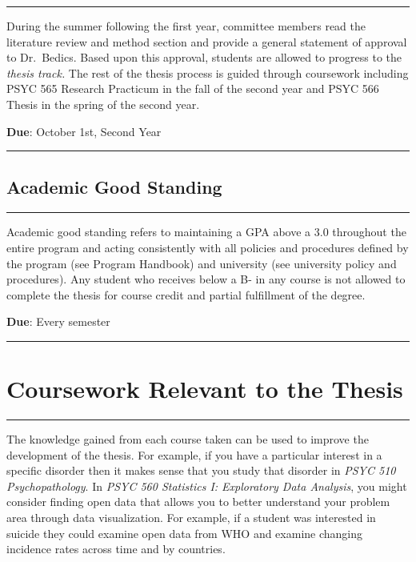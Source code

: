 \documentclass[openany]{book}
\begin{document}
\begin{center}\rule{0.5\linewidth}{0.5pt}\end{center}

During the summer following the first year, committee members read the literature review and method section and provide a general statement of approval to Dr.~Bedics. Based upon this approval, students are allowed to progress to the \emph{thesis track.} The rest of the thesis process is guided through coursework including PSYC 565 Research Practicum in the fall of the second year and PSYC 566 Thesis in the spring of the second year.

\textbf{Due}: October 1st, Second Year

\begin{center}\rule{0.5\linewidth}{0.5pt}\end{center}

\hypertarget{academic-good-standing}{%
\section{Academic Good Standing}\label{academic-good-standing}}

\begin{center}\rule{0.5\linewidth}{0.5pt}\end{center}

Academic good standing refers to maintaining a GPA above a 3.0 throughout the entire program and acting consistently with all policies and procedures defined by the program (see Program Handbook) and university (see university policy and procedures). Any student who receives below a B- in any course is not allowed to complete the thesis for course credit and partial fulfillment of the degree.

\textbf{Due}: Every semester

\begin{center}\rule{0.5\linewidth}{0.5pt}\end{center}

\hypertarget{coursework-relevant-to-the-thesis}{%
\chapter{Coursework Relevant to the Thesis}\label{coursework-relevant-to-the-thesis}}

\begin{center}\rule{0.5\linewidth}{0.5pt}\end{center}

The knowledge gained from each course taken can be used to improve the development of the thesis. For example, if you have a particular interest in a specific disorder then it makes sense that you study that disorder in \emph{PSYC 510 Psychopathology}. In \emph{PSYC 560 Statistics I: Exploratory Data Analysis}, you might consider finding open data that allows you to better understand your problem area through data visualization. For example, if a student was interested in suicide they could examine open data from WHO and examine changing incidence rates across time and by countries.
\end{document}
